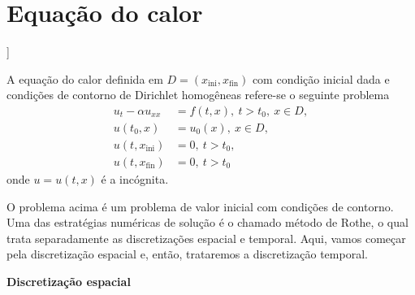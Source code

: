 \section{Equação do calor}\label{cap_edp_sec_calor}

\begin{flushleft}
  [[tag:revisar]]
\end{flushleft}

A equação do calor definida em  $D = (x_{\text{ini}}, x_{\text{fin}})$ com condição inicial dada e condições de contorno de Dirichlet homogêneas refere-se o seguinte problema
\begin{align}
  u_t - \alpha u_{xx} &= f(t,x),~t>t_0,~x\in D, \label{eq:edp_calor_eq}\\
  u(t_0,x) &= u_0(x),~x\in D,\label{eq:edp_calor_ci}\\
  u(t, x_{\text{ini}}) &= 0,~t>t_0,\label{eq:edp_calor_bcxini}\\
  u(t, x_{\text{fin}}) &= 0,~t>t_0\label{eq:edp_calor_bcxfin}
\end{align}
onde $u = u(t,x)$ é a incógnita.

O problema acima é um problema de valor inicial com condições de contorno. Uma das estratégias numéricas de solução é o chamado método de Rothe, o qual trata separadamente as discretizações espacial e temporal. Aqui, vamos começar pela discretização espacial e, então, trataremos a discretização temporal.

\begin{flushleft}
  {\bf Discretização espacial}
\end{flushleft}

